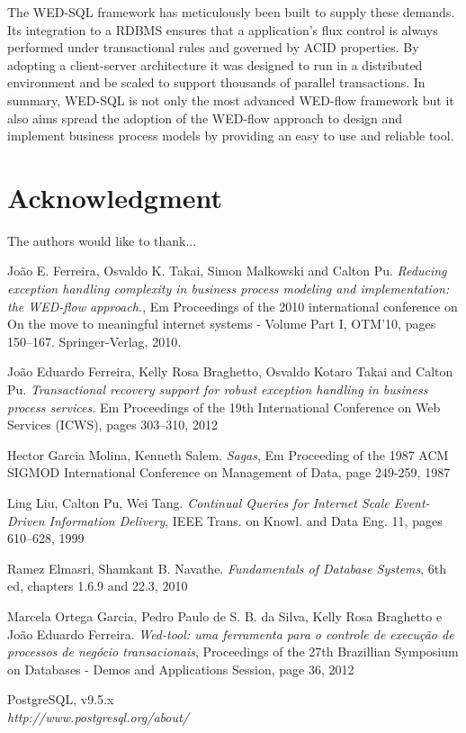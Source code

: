 \documentclass[12pt]{article}
\begin{document}
The WED-SQL framework has meticulously been built to supply these demands. Its integration to a RDBMS ensures that a application's
flux control is always performed under transactional rules and governed by ACID properties. By adopting a client-server
architecture it was designed to run in a distributed environment and be scaled to support thousands of parallel transactions.
In summary, WED-SQL is not only the most advanced WED-flow framework but it also aims spread the adoption of the WED-flow
approach to design and implement business process models by providing an easy to use and reliable tool.  

\section*{Acknowledgment}


The authors would like to thank...

\begin{thebibliography}{1}

João E. Ferreira, Osvaldo K. Takai, Simon Malkowski and Calton Pu. 
\emph{Reducing exception handling complexity in business process modeling and implementation:
the WED-flow approach.}, Em Proceedings of the 2010 international conference on
On the move to meaningful internet systems - Volume Part I, OTM’10, pages
150–167. Springer-Verlag, 2010.

João Eduardo Ferreira, Kelly Rosa Braghetto, Osvaldo Kotaro Takai and
Calton Pu.\emph{ Transactional recovery support for robust exception handling in business process
services.} Em Proceedings of the 19th International Conference on Web Services (ICWS), pages
303–310, 2012

Hector Garcia Molina, Kenneth Salem.
\emph{Sagas}, Em Proceeding of the 1987 ACM SIGMOD International Conference on Management of Data, page 249-259, 1987

Ling Liu, Calton Pu, Wei Tang.
\emph{Continual Queries for Internet Scale Event-Driven Information Delivery},
IEEE Trans. on Knowl. and Data Eng. 11, pages 610–628, 1999

Ramez Elmasri, Shamkant B. Navathe.
\emph{Fundamentals of Database Systems}, 6th ed, chapters 1.6.9 and 22.3, 2010

Marcela Ortega Garcia, Pedro Paulo de S. B. da Silva, Kelly Rosa Braghetto e João Eduardo Ferreira.
\emph{Wed-tool: uma ferramenta para o controle de execução de processos de negócio transacionais},
Proceedings of the 27th Brazillian Symposium on Databases - Demos and Applications Session, page 36, 2012

PostgreSQL, v9.5.x \\
\emph{http://www.postgresql.org/about/}

\end{thebibliography}


\end{document}
